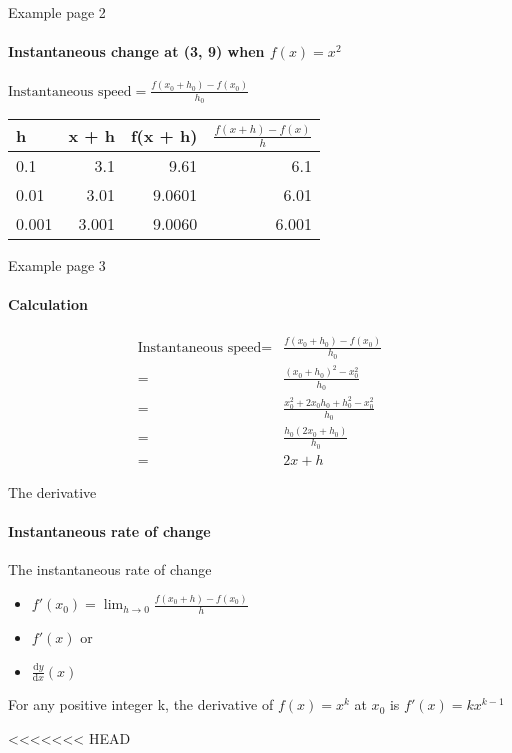 \documentclass[14pt,xcolor=pdftex,dvipsnames,table]{beamer}
\begin{document}
\begin{frame}{Example page 2}
\framesubtitle{Instantaneous change at (3, 9) when $f(x) = x^2$}
$\text{Instantaneous speed} = \frac{f(x_0 + h_0) - f(x_0)}{h_0}$
\vskip 0.25cm
\begin{center}
\begin{tabular}{l r r r}
h & x + h & f(x + h) & $\frac{f(x +h) - f(x)}{h}$\\
\hline
0.1 & 3.1 & 9.61 & 6.1 \\
0.01 & 3.01 & 9.0601 & 6.01 \\
0.001 & 3.001 & 9.0060 & 6.001\\
\end{tabular}
\end{center}
\end{frame}

\begin{frame}{Example page 3}
\framesubtitle{Calculation}
\begin{align*}
\text{Instantaneous speed} = &\frac{f(x_0 + h_0) - f(x_0)}{h_0}\\
 = & \frac{(x_0 + h_0)^2 - x_0^2}{h_0}\\
 = & \frac{x_0^2 +2x_0h_0 + h_0^2 - x_0^2}{h_0}\\
 = & \frac{h_0(2x_0 + h_0)}{h_0}\\
 = & 2x + h
 \end{align*}
 \end{frame}
 
 \begin{frame}{The derivative}
 \framesubtitle{Instantaneous rate of change}
 The instantaneous rate of change 
 \pause
  \begin{itemize}[<+-| alert@+>]
 \item $f'(x_0) = \lim_{h \to 0} \frac{f(x_0 +h) - f(x_0)}{h}$
 \item $f'(x)$
 or
 \item $\frac{\mathrm d y}{\mathrm d x}(x)$
 \end{itemize}
 \pause
 \begin{block}{}
For any positive integer k, the derivative of $f(x) = x^k$ at $x_0$ is $f'(x) = kx^{k-1}$
\end{block}
\end{frame}

<<<<<<< HEAD
\end{document}
